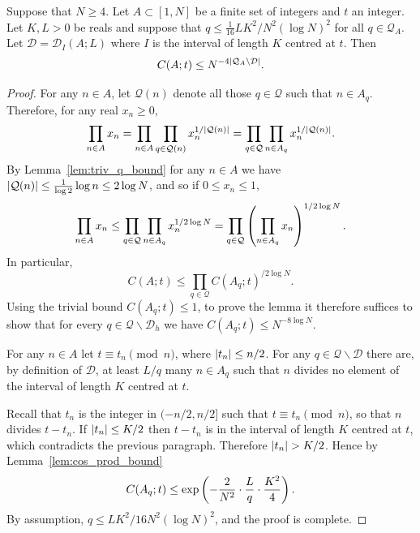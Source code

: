 \begin{lemma}\label{lem:minor2_ind_bound}
  \leanok
Suppose that $N\geq 4$. Let $A\subset [1,N]$ be a finite set of integers and $t$ an integer. Let $K,L>0$ be reals and suppose that $q\leq \tfrac{1}{16}LK^2/N^2(\log N)^2$ for all $q\in \mathcal{Q}_A$. Let $\mathcal{D}=\mathcal{D}_I(A;L)$ where $I$ is the interval of length $K$ centred at $t$. Then
\[C(A;t)\leq N^{-4\left\lvert \mathcal{Q}_A\backslash\mathcal{D}\right\rvert}.\]
\end{lemma}
\begin{proof}
  \leanok
{}
For any $n\in A$, let $\mathcal{Q}(n)$ denote all those $q\in \mathcal{Q}$ such that $n\in A_q$. Therefore, for any real $x_n\geq 0$,
\[\prod_{n\in A}x_n=\prod_{n\in A}\prod_{q\in \mathcal{Q}(n)}x_n^{1/\left\lvert \mathcal{Q}(n)\right\rvert}
=\prod_{q\in\mathcal{Q}}\prod_{n\in A_q}x_n^{1/\left\lvert \mathcal{Q}(n)\right\rvert}.\]
By Lemma~\ref{lem:triv_q_bound} for any $n\in A$ we have $\left\lvert \mathcal{Q}(n)\right\rvert\leq \tfrac{1}{\log 2}\log n\leq 2\log N$, and so if $0\leq x_n\leq 1$,
\[\prod_{n\in A}x_n\leq \prod_{q\in\mathcal{Q}}\prod_{n\in A_q}x_n^{1/2\log N}=\prod_{q\in \mathcal{Q}}\left( \prod_{n\in A_q}x_n\right)^{1/2\log N}.\]
In particular,
 \[C(A;t)\leq \prod_{q\in \mathcal{Q}}C(A_q;t)^{/2\log N}.\]
 Using the trivial bound $C(A_q;t)\leq 1$, to prove the lemma it therefore suffices to show that for every $q\in\mathcal{Q}\backslash\mathcal{D}_h$ we have $C(A_q;t)\leq N^{-8\log N}$.

For any $n\in A$ let $t\equiv t_n\pmod{n}$, where $\left\lvert t_n\right\rvert\leq n/2$. For any $q\in\mathcal{Q}\backslash \mathcal{D}$ there are, by definition of $\mathcal{D}$, at least $L/q$ many $n\in A_q$ such that $n$ divides no element of the interval of length $K$ centred at $t$.

Recall that $t_n$ is the integer in $(-n/2,n/2]$ such that $t\equiv t_n\pmod{n}$, so that $n$ divides $t-t_n$. If $\left\lvert t_n\right\rvert\leq K/2$ then $t-t_n$ is in the interval of length $K$ centred at $t$, which contradicts the previous paragraph. Therefore $\left\lvert t_n\right\rvert>K/2$. Hence by Lemma~\ref{lem:cos_prod_bound}
\[C(A_q;t)\leq\exp\left( -\frac{2}{N^2}\cdot \frac{L}{q}\cdot \frac{K^2}{4}\right).\]
By assumption, $q\leq LK^2/16N^2(\log N)^2$, and the proof is complete.
\end{proof}

